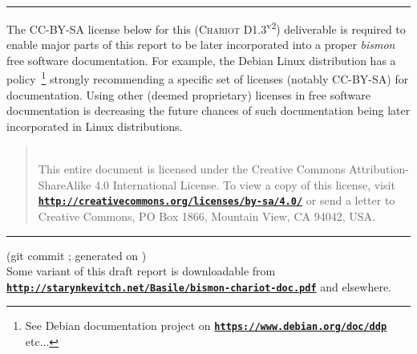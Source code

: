 \documentclass[11pt,a4paper,svgnames]{article}
\newcommand{\bmurl}[1]{{\href{#1}{\texttt{\textbf{#1}}}}}
\begin{document}
\medskip

\hrule 

\medskip

\vspace{2cm}

\bigskip

The CC-BY-SA license below for this (\textsc{Chariot}
D1.3\textsuperscript{v2}) deliverable is required to enable major parts
of this report to be later incorporated into a proper
\emph{bismon} free software documentation. For example, the Debian
Linux distribution has a policy~\footnote{See Debian documentation
  project on \bmurl{https://www.debian.org/doc/ddp} etc...} strongly
recommending a specific set of licenses (notably CC-BY-SA) for
documentation. Using other (deemed proprietary) licenses in free
software documentation is decreasing the future chances of such
documentation being later incorporated in Linux distributions.

\begin{quote}
    \\
    This entire document
is licensed under the Creative Commons Attribution-ShareAlike 4.0
International License. To view a copy of this license, visit
\bmurl{http://creativecommons.org/licenses/by-sa/4.0/} or send a letter to
Creative Commons, PO Box 1866, Mountain View, CA 94042, USA.
\end{quote}

\bigskip

\vspace{2cm}

\bigskip

\hrule 

\medskip

\begin{flushright}
  \begin{relsize}{-1}
    (git commit \texttt{\bmgitcommit}; generated on
    \textit{\bmdoctimestamp})\\
    Some variant of this draft report is
    downloadable from \bmurl{http://starynkevitch.net/Basile/bismon-chariot-doc.pdf} and
    elsewhere.
  \end{relsize}
\end{flushright}
\end{document}
